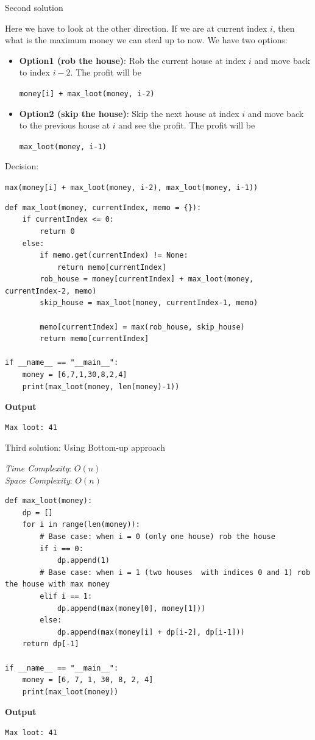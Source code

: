 \documentclass[a4paper,11pt]{book}
\begin{document}
\noindent Second solution

\noindent Here we have to look at the other direction. If we are at current index $i$, then what is the maximum money we can steal up to now. We have two options:

\begin{itemize}
\item \textbf{Option1 (rob the house)}: Rob the current house at index $i$ and move back to index $i-2$. The profit will be \begin{center}
\lstinline{money[i] + max_loot(money, i-2)}
\end{center} 
\item \textbf{Option2 (skip the house)}: Skip the next house at index $i$ and move back to the previous house at $i$ and see the profit. The profit will be \begin{center}
\lstinline{max_loot(money, i-1)}
\end{center}
\end{itemize}

\noindent Decision: \begin{center}
\lstinline{max(money[i] + max_loot(money, i-2), max_loot(money, i-1))}
\end{center}

\begin{lstlisting}
def max_loot(money, currentIndex, memo = {}):
    if currentIndex <= 0:
        return 0
    else:
        if memo.get(currentIndex) != None:
            return memo[currentIndex]
        rob_house = money[currentIndex] + max_loot(money, currentIndex-2, memo)
        skip_house = max_loot(money, currentIndex-1, memo)

        memo[currentIndex] = max(rob_house, skip_house)
        return memo[currentIndex]
        
if __name__ == "__main__":
    money = [6,7,1,30,8,2,4]
    print(max_loot(money, len(money)-1))
\end{lstlisting}
\textbf{Output}
\begin{lstlisting}
Max loot: 41
\end{lstlisting}

\noindent Third solution: Using Bottom-up approach

\noindent \textit{Time Complexity}: $O(n)$\\
\noindent \textit{Space Complexity}: $O(n)$

\begin{lstlisting}
def max_loot(money):
    dp = []
    for i in range(len(money)):
        # Base case: when i = 0 (only one house) rob the house
        if i == 0:
            dp.append(1)
        # Base case: when i = 1 (two houses  with indices 0 and 1) rob the house with max money
        elif i == 1:
            dp.append(max(money[0], money[1]))
        else:
            dp.append(max(money[i] + dp[i-2], dp[i-1]))
    return dp[-1]  
 
if __name__ == "__main__":
    money = [6, 7, 1, 30, 8, 2, 4]
    print(max_loot(money))
\end{lstlisting}
\textbf{Output}
\begin{lstlisting}
Max loot: 41
\end{lstlisting}
\end{document}

